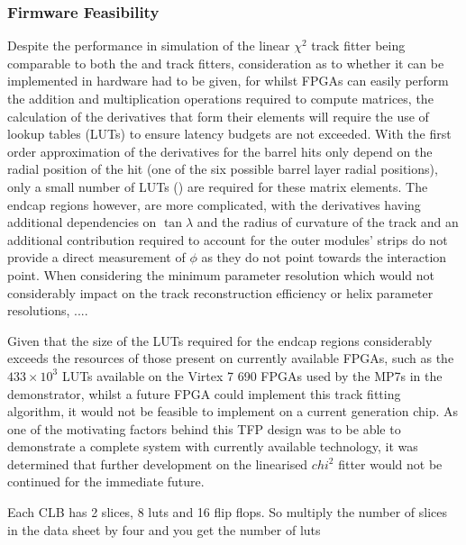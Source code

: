 \subsubsection{Firmware Feasibility}\label{subsubsec:chi2firmware}
Despite the performance in simulation of the linear $\chi^{2}$ track fitter being comparable to both the \KF and \LR track fitters, consideration as to whether it can be implemented in hardware had to be given, for whilst FPGAs can easily perform the addition and multiplication operations required to compute matrices, the calculation of the derivatives that form their elements will require the use of lookup tables (LUTs) to ensure latency budgets are not exceeded.
With the first order approximation of the derivatives for the barrel hits only depend on the radial position of the hit (\ie one of the six possible barrel layer radial positions), only a small number of LUTs () are required for these matrix elements.
The endcap regions however, are more complicated, with the derivatives having additional dependencies on $\tan \lambda$ and the radius of curvature of the track and an additional contribution required to account for the outer modules' strips do not provide a direct measurement of $\phi$ as they do not point towards the interaction point.
When considering the minimum parameter resolution which would not considerably impact on the track reconstruction efficiency or helix parameter resolutions, .... 

Given that the size of the LUTs required for the endcap regions considerably exceeds the resources of those present on currently available FPGAs, such as the $433 \times 10^{3}$ LUTs available on the Virtex 7 690 FPGAs used by the MP7s in the demonstrator, whilst a future FPGA could implement this track fitting algorithm, it would not be feasible to implement on a current generation chip.
As one of the motivating factors behind this TFP design was to be able to demonstrate a complete system with currently available technology, it was determined that further development on the linearised $chi^{2}$ fitter would not be continued for the immediate future.




Each CLB has 2 slices, 8 luts and 16 flip flops. So multiply the number of slices in the data sheet by four and you get the number of luts

